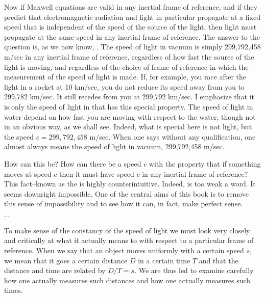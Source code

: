 Now if Maxwell equations are valid in any inertial frame of reference, and if they predict that electromagnetic radiation and light in particular propagate at a fixed speed that is independent of the speed of the source of the light, then light must propagate at the same speed in any inertial frame of reference. The answer to the question  is, as we now know, . The speed of light in vacuum is simply 299,792,458 m/sec in any inertial frame of reference, regardless of how fast the source of the light is moving, and regardless of the choice of frame of reference in which the measurement of the speed of light is made. If, for example, you race after the light in a rocket at 10 km/sec, you do not reduce its speed away from you to 299,782 km/sec. It still recedes from you at 299,792 km/sec. I emphasize that it is only the speed of light in  that has this special property. The speed of light in water  depend on how fast you are moving with respect to the water, though not in an obvious way, as we shall see. Indeed, what is special here is not light, but the speed $c = 299,792,458$ m/sec. When one says  without any qualification, one almost always means the speed of light in vacuum, 299,792,458 m/sec.

How can this be? How can there be a speed $c$ with the property that if something moves at speed $c$ then it must have speed $c$ in any inertial frame of reference? This fact--known as the  is highly counterintuitive. Indeed,  is too weak a word. It seems downright impossible. One of the central aims of this book is to remove this sense of impossibility and to see how it can, in fact, make perfect sense.

$\cdots$

To make sense of the constancy of the speed of light we must look very closely and critically at what it actually means to  with respect to a particular frame of reference. When we say that an object moves uniformly with a certain speed $s$, we mean that it goes a certain distance $D$ in a certain time $T$ and that the distance and time are related by $D/T = s$. We are thus led to examine carefully how one actually measures such distances and how one actually measures such times.


